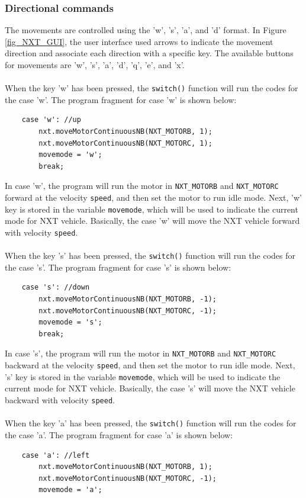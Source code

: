 \subsubsection*{Directional commands}
The movements are controlled using the 'w', 's', 'a', and 'd' format. In Figure \ref{fig_NXT_GUI}, 
the user interface used arrows to indicate the movement direction and associate each direction with 
a specific key. The available buttons for movements are 'w', 's', 'a', 'd', 'q', 'e', and 'x'.
\\ \\
\noindent
When the key 'w' has been pressed, the \verb+switch()+ function will run the codes for the case 'w'.
The program fragment for case 'w' is shown below:
\begin{verbatim} 
    case 'w': //up
        nxt.moveMotorContinuousNB(NXT_MOTORB, 1);
        nxt.moveMotorContinuousNB(NXT_MOTORC, 1);
        movemode = 'w';
        break;
\end{verbatim}
In case 'w', the program will run the motor in \verb+NXT_MOTORB+ and \verb+NXT_MOTORC+ forward at
the velocity \verb+speed+, and then set the motor to run idle mode. Next, 'w' key is stored in the 
variable \verb+movemode+, which will be used to indicate the current mode for NXT vehicle. Basically,
the case 'w' will move the NXT vehicle forward with velocity \verb+speed+.
\\ \\
\noindent
When the key 's' has been pressed, the \verb+switch()+ function will run the codes for the case 's'.
The program fragment for case 's' is shown below:
\begin{verbatim} 
    case 's': //down
        nxt.moveMotorContinuousNB(NXT_MOTORB, -1);
        nxt.moveMotorContinuousNB(NXT_MOTORC, -1);
        movemode = 's';
        break;
\end{verbatim}
In case 's', the program will run the motor in \verb+NXT_MOTORB+ and \verb+NXT_MOTORC+ backward 
at the velocity \verb+speed+, and then set the motor to run idle mode. Next, 's' key is stored in the
variable \verb+movemode+, which will be used to indicate the current mode for NXT vehicle. Basically,
the case 's' will move the NXT vehicle backward with velocity \verb+speed+.
\\ \\
\noindent 
When the key 'a' has been pressed, the \verb+switch()+ function will run the codes for the case 'a'.
The program fragment for case 'a' is shown below:
\begin{verbatim} 
    case 'a': //left
        nxt.moveMotorContinuousNB(NXT_MOTORB, 1);
        nxt.moveMotorContinuousNB(NXT_MOTORC, -1);
        movemode = 'a';
\end{verbatim}
